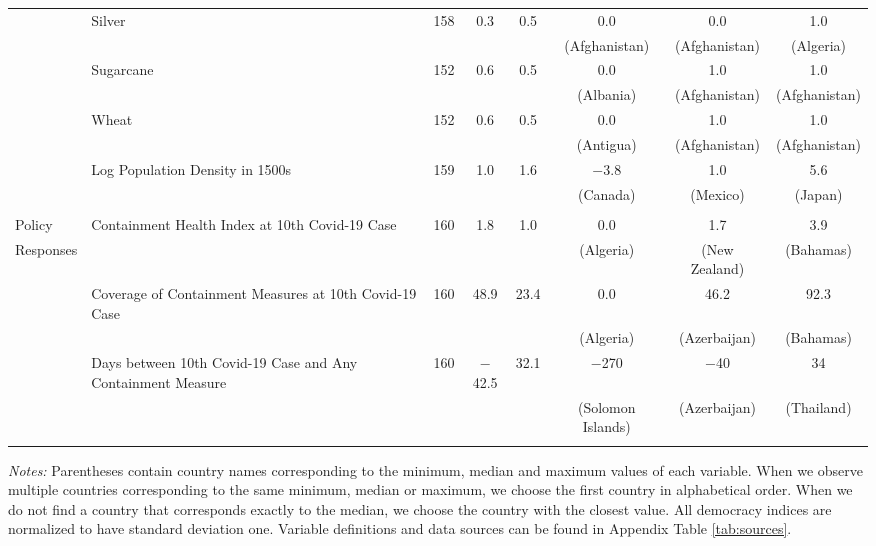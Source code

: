 \begin{table}[!htbp]
\begin{threeparttable}
\begin{tabular}{@{\extracolsep{0pt}}llcccccc}
& Silver & 158 & 0.3 & 0.5 & 0.0 & 0.0 & 1.0 \\ 
& & & & & (Afghanistan) & (Afghanistan) & (Algeria) \\
& Sugarcane & 152 & 0.6 & 0.5 & 0.0 & 1.0 & 1.0 \\ 
& & & & & (Albania) & (Afghanistan) & (Afghanistan) \\
& Wheat& 152 & 0.6 & 0.5 & 0.0 & 1.0 & 1.0 \\ 
& & & & & (Antigua) & (Afghanistan) & (Afghanistan) \\
& Log Population Density in 1500s & 159 & 1.0 & 1.6 & $-$3.8 & 1.0 & 5.6 \\ 
& & & & & (Canada) & (Mexico) & (Japan) \\ 
\hline \\[-1.8ex] 

Policy & Containment Health Index at 10th Covid-19 Case & 160 & 1.8 & 1.0 & 0.0 & 1.7 & 3.9 \\ 
Responses & & & & & (Algeria) & (New Zealand) & (Bahamas) \\
 & Coverage of Containment Measures at 10th Covid-19 Case & 160 & 48.9 & 23.4 & 0.0 & 46.2 & 92.3 \\ 
& & & & & (Algeria) & (Azerbaijan) & (Bahamas) \\
& Days between 10th Covid-19 Case and Any Containment Measure & 160 & $-$42.5 & 32.1 & $-$270 & $-$40 & 34 \\ 
& & & & & (Solomon Islands) & (Azerbaijan) & (Thailand) \\
\hline \\[-1.8ex] 
\end{tabular}
\begin{tablenotes}
            \item{\textit{Notes:}} Parentheses contain country names corresponding to the minimum, median and maximum values of each variable. When we observe multiple countries corresponding to the same minimum, median or maximum, we choose the first country in alphabetical order. When we do not find a country that corresponds exactly to the median, we choose the country with the closest value.  All democracy indices are normalized to have standard deviation one. Variable definitions and data sources can be found in Appendix Table \ref{tab:sources}.
        \end{tablenotes}
\end{threeparttable}

\end{table} 

